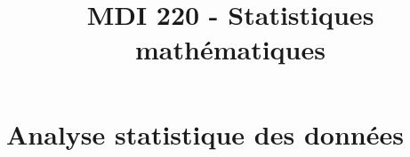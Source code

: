 \documentclass[a4paper,9pt]{article}
\title{\vspace{-1.2cm} MDI 220 - Statistiques mathématiques}
\date{}
\begin{document}
\maketitle

\vspace{-1.5cm}

\section{Analyse statistique des données}

	
\end{document}
